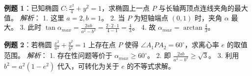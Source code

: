 \begin{examplebox}
\textbf{例题 1}：已知椭圆 $C: \frac{x^2}{4} + y^2 = 1$，求椭圆上一点 $P$ 与长轴两顶点连线夹角的最大值。
\textit{解析}：
1. 这里 $a=2, b=1$。
2. 当 $P$ 为短轴端点 $(0, 1)$ 时，夹角 $\alpha$ 最大。
3. 此时 $\tan \alpha_{max} = \frac{2ab}{a^2-b^2} = \frac{2 \cdot 2 \cdot 1}{4-1} = \frac{4}{3}$。
4. 故 $\alpha_{max} = \arctan \frac{4}{3}$。

\textbf{例题 2}：若椭圆 $\frac{x^2}{a^2} + \frac{y^2}{b^2} = 1$ 上存在点 $P$ 使得 $\angle A_1PA_2 = 60^\circ$，求离心率 $e$ 的取值范围。
\textit{解析}：
1. 存在性问题等价于 $\alpha_{max} \ge 60^\circ$。
2. 即 $\frac{2ab}{a^2-b^2} \ge \sqrt{3}$。
3. 利用 $b^2 = a^2(1-e^2)$ 代入，可转化为关于 $e$ 的不等式求解。
\end{examplebox}